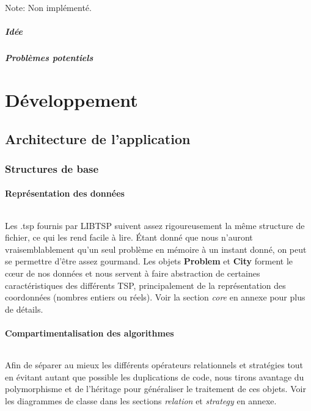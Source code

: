\documentclass[a4paper,10pt]{report}
\begin{document}
Note: Non implémenté.

\subsubsection{Idée}

\subsubsection{Problèmes potentiels}


\part{Développement}
\chapter{Architecture de l'application}
\section{Structures de base}
\subsection{Représentation des données}
\paragraph{}
  Les .tsp fournis par LIBTSP suivent assez rigoureusement la même structure de
fichier, ce qui les rend facile à lire. Étant donné que nous n'auront
vraisemblablement qu'un seul problème en mémoire à un instant donné, on peut se
permettre d'être assez gourmand. Les objets \textbf{Problem} et \textbf{City}
forment le cœur de nos données et nous servent à faire abstraction de certaines
caractéristiques des différents TSP, principalement de la représentation des
coordonnées (nombres entiers ou réels). Voir la section \textit{core} en annexe
pour plus de détails.

\subsection{Compartimentalisation des algorithmes}
\paragraph{}
  Afin de séparer au mieux les différents opérateurs relationnels et stratégies
tout en évitant autant que possible les duplications de code, nous tirons
avantage du polymorphisme et de l'héritage pour généraliser le traitement de ces
objets. Voir les diagrammes de classe dans les sections \textit{relation} et
\textit{strategy} en annexe.
\end{document}
